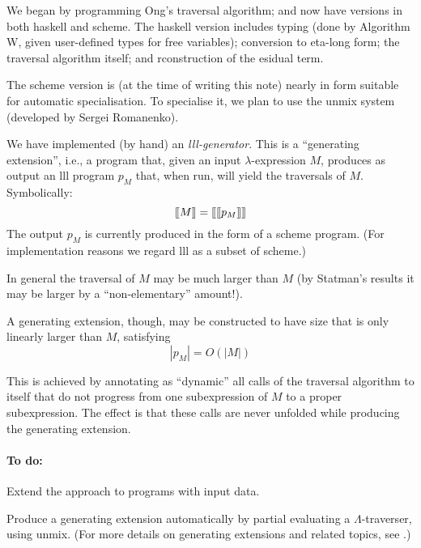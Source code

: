 \documentclass{llncs}
\begin{document}
\be
\item We began by programming Ong's  traversal algorithm; and now have versions in both {\sc haskell} and {\sc scheme}. The {\sc haskell} version includes typing (done by Algorithm W, given user-defined types for free variables); conversion to eta-long form;  the traversal algorithm itself; and rconstruction of the esidual term.

\item The {\sc scheme} version is (at the time of writing this note) nearly in form suitable for automatic specialisation. To specialise it, we plan to use the {\sc unmix} system (developed by Sergei Romanenko).

\item We have implemented (by hand) an {\em {\sc lll}-generator}. This is a ``generating extension'', i.e., a program that, given an input $\lambda$-expression $M$, produces as output an {\sc lll}  program $p_M$  that, when run, will yield the traversals of $M$. Symbolically:
$$\mbox{$\lbrack\hspace{-0.3ex}\lbrack$} M\mbox{$\rbrack\hspace{-0.3ex}\rbrack$} = \mbox{$\lbrack\hspace{-0.3ex}\lbrack$} \mbox{$\lbrack\hspace{-0.3ex}\lbrack$} p_M\mbox{$\rbrack\hspace{-0.3ex}\rbrack$} \mbox{$\rbrack\hspace{-0.3ex}\rbrack$}
$$
The output $p_M$ is currently produced in the form of a {\sc scheme}  program. (For implementation  reasons we regard {\sc lll} as a subset of {\sc scheme}.)


\item In general the traversal of $M$ may be much larger than $M$ (by Statman's results it may be larger by a ``non-elementary'' amount!). 

A generating extension, though,  may be constructed to have size that is only linearly larger than $M$, satisfying 
$$|p_M| = O(|M|)$$

This is achieved by annotating as ``dynamic'' all calls of the traversal algorithm to itself that do not progress from one subexpression of $M$ to a proper subexpression. The effect is that these calls are never unfolded while producing the generating extension.

\ee


\paragraph{To do:} 

\be

\item Extend the approach to programs with input data.


\item Produce a generating extension automatically by partial evaluating a $\Lambda$-traverser,  using {\sc unmix}. 
(For more details on generating extensions and related topics, see \cite{jgs93}.)
\end{document}
